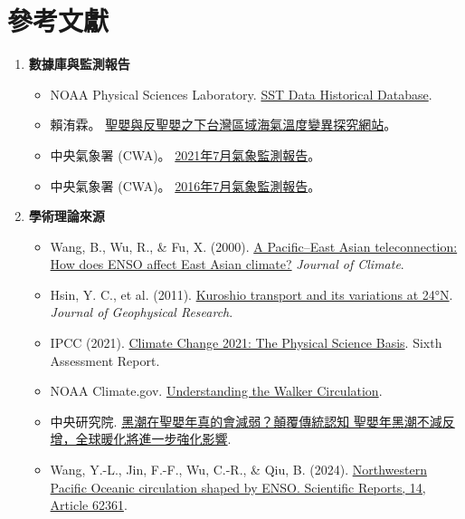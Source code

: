 \documentclass[UTF8, fontset=none,12pt]{ctexart}
\begin{document}
\section{參考文獻}
\begin{enumerate}
    \item \textbf{數據庫與監測報告}
    \begin{itemize}
        \item NOAA Physical Sciences Laboratory. \href{https://coastwatch.pfeg.noaa.gov}{SST Data Historical Database}.
        \item 賴洧霖。 \href{https://weilinlai719.github.io/earth-science-explore/}{聖嬰與反聖嬰之下台灣區域海氣溫度變異探究網站}。
        \item 中央氣象署 (CWA)。 \href{https://www.cwa.gov.tw/Data/climate/Watch/twn/twn-monitor_2021-6.pdf}{2021年7月氣象監測報告}。
        \item 中央氣象署 (CWA)。 \href{https://www.cwa.gov.tw/Data/climate/Watch/twn/twn-monitor_2016-6.pdf}{2016年7月氣象監測報告}。
    \end{itemize}

    \item \textbf{學術理論來源}
    \begin{itemize}
        \item Wang, B., Wu, R., \& Fu, X. (2000). \href{https://journals.ametsoc.org/view/journals/clim/13/9/1520-0442_2000_013_1517_apeath_2.0.co_2.xml}{A Pacific–East Asian teleconnection: How does ENSO affect East Asian climate?} \textit{Journal of Climate}.
        \item Hsin, Y. C., et al. (2011). \href{https://agupubs.onlinelibrary.wiley.com/doi/full/10.1029/2011JC007185}{Kuroshio transport and its variations at 24°N}. \textit{Journal of Geophysical Research}.
        \item IPCC (2021). \href{https://www.ipcc.ch/report/ar6/wg1/}{Climate Change 2021: The Physical Science Basis}. Sixth Assessment Report.
        \item NOAA Climate.gov. \href{https://www.climate.gov/news-features/blogs/enso/april-2024-enso-update-gone-fishing}{Understanding the Walker Circulation}.
        \item 中央研究院. \href{https://netzero.sinica.edu.tw/cases_detail/17}{黑潮在聖嬰年真的會減弱？顛覆傳統認知 聖嬰年黑潮不減反增，全球暖化將進一步強化影響}.
        \item Wang, Y.-L., Jin, F.-F., Wu, C.-R., \& Qiu, B. (2024). \href{https://www.nature.com/articles/s41598-024-62361-z}{Northwestern Pacific Oceanic circulation shaped by ENSO. Scientific Reports, 14, Article 62361}.
    \end{itemize}
\end{enumerate}
\end{document}
